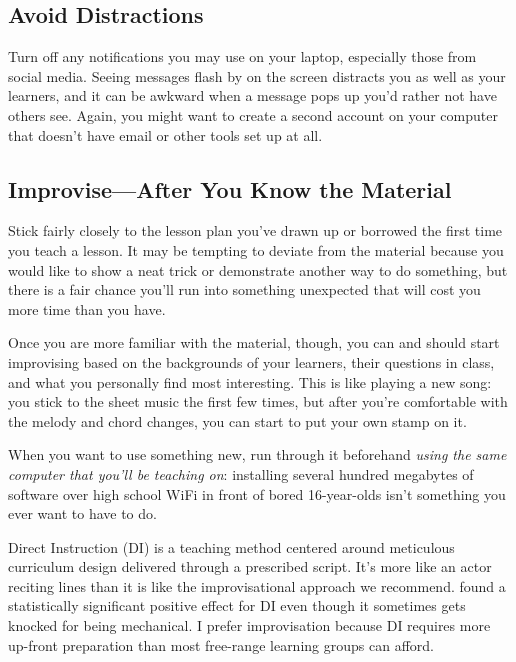 \subsection*{Avoid Distractions}

Turn off any notifications you may use on your laptop,
especially those from social media.
Seeing messages flash by on the screen distracts you as well as your learners,
and it can be awkward when a message pops up you'd rather not have others see.
Again,
you might want to create a second account on your computer
that doesn't have email or other tools set up at all.

\subsection*{Improvise---After You Know the Material}

Stick fairly closely to the lesson plan you've drawn up or borrowed
the first time you teach a lesson.
It may be tempting to deviate from the material
because you would like to show a neat trick or demonstrate another way to do something,
but there is a fair chance you'll run into something unexpected
that will cost you more time than you have.

Once you are more familiar with the material,
though,
you can and should start improvising based on the backgrounds of your learners,
their questions in class,
and what you personally find most interesting.
This is like playing a new song:
you stick to the sheet music the first few times,
but after you're comfortable with the melody and chord changes,
you can start to put your own stamp on it.

When you want to use something new,
run through it beforehand
\emph{using the same computer that you'll be teaching on}:
installing several hundred megabytes of software over high school WiFi
in front of bored 16-year-olds isn't something you ever want to have to do.

\begin{aside}{Direct Instruction}
   (DI) is a teaching method
  centered around meticulous curriculum design delivered through a prescribed script.
  It's more like an actor reciting lines than it is like the improvisational approach we recommend.
  \cite{Stoc2018} found a statistically significant positive effect for DI
  even though it sometimes gets knocked for being mechanical.
  I prefer improvisation because DI requires more up-front preparation
  than most free-range learning groups can afford.
\end{aside}

